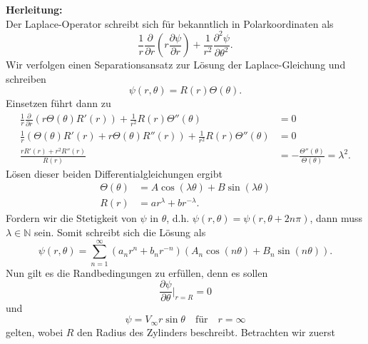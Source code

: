 \documentclass[12pt]{exam}
\newcommand{\del}{\partial}
\begin{document}
\begin{questions}
\begin{solution}
        \textbf{Herleitung:} \\
        Der Laplace-Operator schreibt sich für bekanntlich in Polarkoordinaten als
        \begin{equation*}
            \frac{1}{r} \frac{\del}{\del r} \left( r \frac{\del \psi}{\del r} \right) + \frac{1}{r^2} \frac{\del^2 \psi}{\del \theta^2}.
        \end{equation*}
        Wir verfolgen einen Separationsansatz zur Lösung der Laplace-Gleichung und schreiben
        \begin{equation*}
            \psi(r, \theta) = R(r) \Theta(\theta).
        \end{equation*}
        Einsetzen führt dann zu
        \begin{align*}
            \frac{1}{r} \frac{\del}{\del r} \left( r \Theta(\theta) R'(r) \right) + \frac{1}{r^2} R(r) \Theta''(\theta) &= 0 \\
            \frac{1}{r} \left( \Theta(\theta) R'(r) + r \Theta(\theta) R''(r) \right) + \frac{1}{r^2} R(r) \Theta''(\theta) &= 0 \\
            \frac{r R'(r) + r^2 R''(r)}{R(r)} &= -\frac{\Theta''(\theta)}{\Theta(\theta)} = \lambda^2.
        \end{align*}
        Lösen dieser beiden Differentialgleichungen ergibt
        \begin{align*}
            \Theta(\theta) &= A \cos(\lambda \theta) + B \sin(\lambda \theta) \\
            R(r) &= a r^{\lambda} + b r^{-\lambda}.
        \end{align*}
        Fordern wir die Stetigkeit von $\psi$ in $\theta$, d.h. $\psi(r, \theta) = \psi(r, \theta + 2 n \pi)$, dann muss $\lambda \in \mathbb{N}$ sein. Somit schreibt sich die Lösung als
        \begin{equation*}
            \psi(r, \theta) = \sum_{n=1}^{\infty} (a_n r^n + b_n r^{-n})(A_n \cos(n \theta) + B_n \sin(n \theta)).
        \end{equation*}
        Nun gilt es die Randbedingungen zu erfüllen, denn es sollen
        \begin{equation*}
            \frac{\del \psi}{\del \theta} \bigg\vert_{r=R} = 0
        \end{equation*}
        und
        \begin{equation*}
            \psi = V_{\infty} r \sin \theta \quad \text{für} \quad r = \infty
        \end{equation*}
        gelten, wobei $R$ den Radius des Zylinders beschreibt. Betrachten wir zuerst

\end{solution}
\end{questions}
\end{document}
